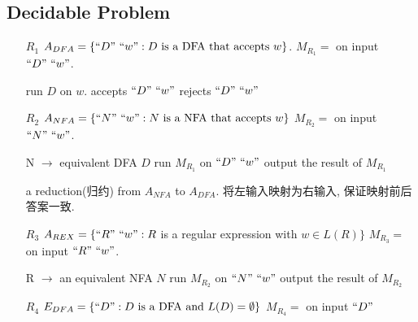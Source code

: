 \subsection{Decidable Problem}
\begin{enumerate}
    \item [$R_1$] $A_{DFA}=\{ ``D"\ ``w": D \text{ is a DFA that accepts }w \}$. 
    \subitem $M_{R_1}=$ on input $``D"\ ``w"$.

    \begin{algorithm}[!htb]
        \caption{$M_{R_1}$}
        \begin{algorithmic}
            \State run $D$ on $w$.
                \State accepts $``D"\ ``w"$
            \Else
                \State rejects $``D"\ ``w"$
            \EndIf
        \end{algorithmic}
    \end{algorithm}
    \item [$R_2$] $A_{NFA}=\{ ``N"\ ``w": N \text{ is a NFA that accepts }w \}$
    \subitem $M_{R_2}=$ on input $``N"\ ``w"$.
    \begin{algorithm}[H]
        \caption{$M_{R_2}$}
        \begin{algorithmic}
            \State N $\to$ equivalent DFA $D$
            \State run $M_{R_1}$ on $``D"\ ``w"$
            \State output the result of $M_{R_1}$
        \end{algorithmic}
    \end{algorithm}
    a reduction(归约) from $A_{NFA}$ to $A_{DFA}$. 将左输入映射为右输入, 保证映射前后答案一致. 
    \item [$R_3$] $A_{REX}=\{ ``R"\ ``w": R $ is a regular expression with $w\in L(R)  \}$
    \subitem $M_{R_3}=$ on input $``R"\ ``w"$.
    \begin{algorithm}[H]
        \caption{$M_{R_3}$}
        \begin{algorithmic}
            \State R $\to$ an equivalent NFA $N$
            \State run $M_{R_2}$ on $``N"\ ``w"$
            \State output the result of $M_{R_2}$
        \end{algorithmic}
    \end{algorithm}
    \item [$R_4$] $E_{DFA}=\{ ``D": D \text{ is a DFA and }L(D)=\emptyset \}$
    \subitem $M_{R_4}=$ on input $``D"$
    \begin{algorithm}[H]
        \caption{$M_{R_4}$}
        \begin{algorithmic}

\end{algorithmic}
\end{algorithm}
\end{enumerate}
